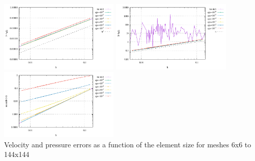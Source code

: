 \begin{center}
\includegraphics[width=5.7cm]{python_codes/fieldstone_115/results/buha06/errorsV_local.pdf}
\includegraphics[width=5.7cm]{python_codes/fieldstone_115/results/buha06/errorsP_local.pdf}
\includegraphics[width=5.7cm]{python_codes/fieldstone_115/results/buha06/divv_local.pdf}\\
{\captionfont Velocity and pressure errors as a function of the element size for meshes 6x6 to 144x144}
\end{center}





